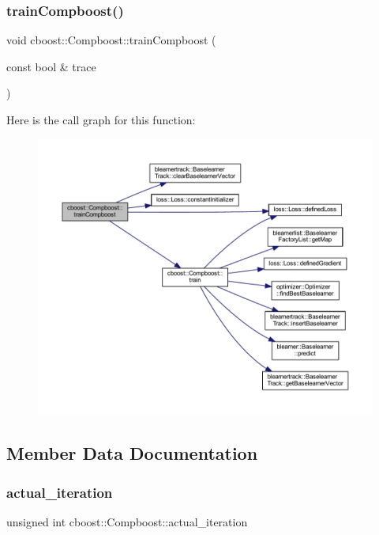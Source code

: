 \subsubsection{\texorpdfstring{train\+Compboost()}{trainCompboost()}}
{\footnotesize\ttfamily void cboost\+::\+Compboost\+::train\+Compboost (\begin{DoxyParamCaption}\item[{const bool \&}]{trace }\end{DoxyParamCaption})}

Here is the call graph for this function\+:
\nopagebreak
\begin{figure}[H]
\begin{center}
\leavevmode
\includegraphics[width=350pt]{classcboost_1_1_compboost_a52ea04dec53c68865fdc4a79461d17cb_cgraph}
\end{center}
\end{figure}


\subsection{Member Data Documentation}
\mbox{\label{classcboost_1_1_compboost_a3db81c285c1cd238d0fb65dfc6c00439}} 
\subsubsection{\texorpdfstring{actual\+\_\+iteration}{actual\_iteration}}
{\footnotesize\ttfamily unsigned int cboost\+::\+Compboost\+::actual\+\_\+iteration\hspace{0.3cm}{\ttfamily [private]}}

